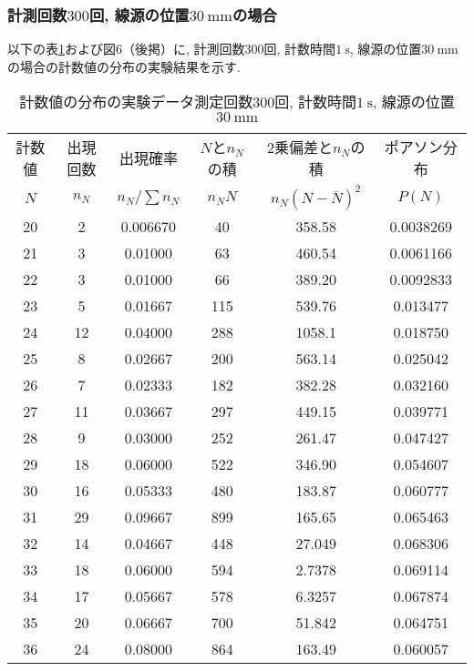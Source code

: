 \documentclass{jarticle}
\begin{document}
\subsubsection{計測回数$300$回, 線源の位置$30\ \mathrm{mm}$の場合}

以下の表\ref{tb:count-distribution-30mm-300times}および図6（後掲）に, 計測回数$300$回, 計数時間$1\ \mathrm{s}$, 線源の位置$30\ \mathrm{mm}$の場合の計数値の分布の実験結果を示す.

\begin{table}[H]
  \caption{計数値の分布の実験データ\protect\linebreak 測定回数$300$回, 計数時間$1\ \mathrm{s}$, 線源の位置$30\ \mathrm{mm}$}
  \label{tb:count-distribution-30mm-300times}
  \hspace{-1cm}
  \begin{tabular}{cccccc}
    \hline
    計数値 & 出現回数 & 出現確率 & $N$と$n_N$の積 & 2乗偏差と$n_N$の積 & ポアソン分布 \\
    $N$ & $n_N$ & $n_N/\sum n_N$ & $n_N N$ & $n_N(N-\overline{N})^2$ & $P(N)$ \\
    \hline
    20 & 2 & 0.006670 & 40 & 358.58 & 0.0038269 \\
    21 & 3 & 0.01000 & 63 & 460.54 & 0.0061166 \\
    22 & 3 & 0.01000 & 66 & 389.20 & 0.0092833 \\
    23 & 5 & 0.01667 & 115 & 539.76 & 0.013477 \\
    24 & 12 & 0.04000 & 288 & 1058.1 & 0.018750 \\
    25 & 8 & 0.02667 & 200 & 563.14 & 0.025042 \\
    26 & 7 & 0.02333 & 182 & 382.28 & 0.032160 \\
    27 & 11 & 0.03667 & 297 & 449.15 & 0.039771 \\
    28 & 9 & 0.03000 & 252 & 261.47 & 0.047427 \\
    29 & 18 & 0.06000 & 522 & 346.90 & 0.054607 \\
    30 & 16 & 0.05333 & 480 & 183.87 & 0.060777 \\
    31 & 29 & 0.09667 & 899 & 165.65 & 0.065463 \\
    32 & 14 & 0.04667 & 448 & 27.049 & 0.068306 \\
    33 & 18 & 0.06000 & 594 & 2.7378 & 0.069114 \\
    34 & 17 & 0.05667 & 578 & 6.3257 & 0.067874 \\
    35 & 20 & 0.06667 & 700 & 51.842 & 0.064751 \\
    36 & 24 & 0.08000 & 864 & 163.49 & 0.060057 \\

\end{tabular}
\end{table}
\end{document}
